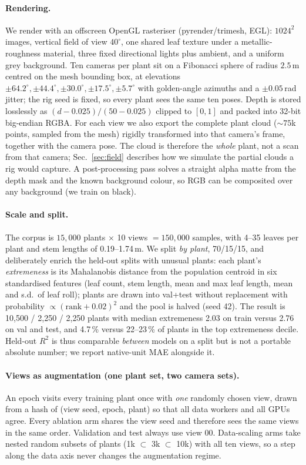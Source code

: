 \paragraph{Rendering.}
We render with an offscreen OpenGL rasteriser (pyrender/trimesh, EGL): $1024^2$
images, vertical field of view $40^\circ$, one shared leaf texture under a
metallic-roughness material, three fixed directional lights plus ambient, and a
uniform grey background. Ten cameras per plant sit on a Fibonacci sphere of radius
$2.5$\,m centred on the mesh bounding box, at elevations
$\pm64.2^\circ,\pm44.4^\circ,\pm30.0^\circ,\pm17.5^\circ,\pm5.7^\circ$ with
golden-angle azimuths and a $\pm0.05$\,rad jitter; the rig seed is fixed, so every
plant sees the same ten poses. Depth is stored losslessly as
$(d-0.025)/(50-0.025)$ clipped to $[0,1]$ and packed into 32-bit big-endian RGBA.
For each view we also export the complete plant cloud (${\sim}75$k points, sampled
from the mesh) rigidly transformed into that camera's frame, together with the
camera pose. The cloud is therefore the \emph{whole} plant, not a scan from that
camera; Sec.~\ref{sec:field} describes how we simulate the partial clouds a rig
would capture. A post-processing pass solves a straight alpha matte from the depth
mask and the known background colour, so RGB can be composited over any background
(we train on black).

\paragraph{Scale and split.}
The corpus is $15{,}000$ plants $\times$ 10 views $=150{,}000$ samples, with
4--35 leaves per plant and stem lengths of 0.19--1.74\,m. We split \emph{by
plant}, 70/15/15, and deliberately enrich the held-out splits with unusual
plants: each plant's \emph{extremeness} is its Mahalanobis distance from the
population centroid in six standardised features (leaf count, stem length, mean and
max leaf length, mean and s.d.\ of leaf roll); plants are drawn into val+test
without replacement with probability $\propto(\mathrm{rank}+0.02)^2$ and the pool
is halved (seed 42). The result is 10{,}500 / 2{,}250 / 2{,}250 plants with median
extremeness 2.03 on train versus 2.76 on val and test, and 4.7\,\% versus
22--23\,\% of plants in the top extremeness decile. Held-out $R^2$ is thus
comparable \emph{between} models on a split but is not a portable absolute
number; we report native-unit MAE alongside it.

\paragraph{Views as augmentation (one plant set, two camera sets).}
An epoch visits every training plant once with \emph{one} randomly chosen view,
drawn from a hash of (view seed, epoch, plant) so that all data workers and all
GPUs agree. Every ablation arm shares the view seed and therefore sees the same
views in the same order. Validation and test always use view 00. Data-scaling arms
take nested random subsets of plants (1k $\subset$ 3k $\subset$ 10k) with all ten
views, so a step along the data axis never changes the augmentation regime.

